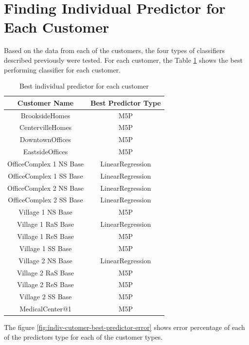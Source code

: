 \section{Finding Individual Predictor for Each Customer}
Based on the data from each of the customers, the four types of classifiers described previously were tested. For each customer, the Table \ref{table:1} shows the best performing classifier for each customer. 

\begin{table}[h!]
\centering
\caption{Best individual predictor for each customer}
\begin{tabular}{|c| c|} 
 \hline
 Customer Name & Best Predictor Type \\ [0.5ex] 
 \hline
BrooksideHomes &	M5P \\
CentervilleHomes &	M5P \\
DowntownOffices &	M5P \\
EastsideOffices &	M5P \\
OfficeComplex 1 NS Base &	LinearRegression \\
OfficeComplex 1 SS Base &	LinearRegression \\
OfficeComplex 2 NS Base &	LinearRegression \\
OfficeComplex 2 SS Base &	LinearRegression \\
Village 1 NS Base &	M5P \\
Village 1 RaS Base &	LinearRegression \\
Village 1 ReS Base &	M5P \\
Village 1 SS Base &	M5P \\
Village 2 NS Base &	LinearRegression \\
Village 2 RaS Base &	M5P \\
Village 2 ReS Base &	M5P \\
Village 2 SS Base &	M5P \\
MedicalCenter@1	& M5P \\ [1ex] 
 \hline
\end{tabular}
\label{table:1}
\end{table}

The figure \ref{fig:indiv-cutomer-best-predictor-error} shows error percentage of each of the predictors type for each of the customer types.

